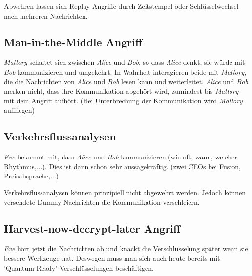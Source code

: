 Abwehren lassen sich Replay Angriffe durch Zeitstempel oder Schlüsselwechsel nach mehreren Nachrichten.

\subsection{Man-in-the-Middle Angriff}
\textit{Mallory} schaltet sich zwischen \textit{Alice} und \textit{Bob}, so dass \textit{Alice} denkt, sie würde mit \textit{Bob} kommunizieren und umgekehrt. In Wahrheit interagieren beide mit \textit{Mallory}, die die Nachrichten von \textit{Alice} und \textit{Bob} lesen kann und weiterleitet. \textit{Alice} und \textit{Bob} merken nicht, dass ihre Kommunikation abgehört wird, zumindest bis \textit{Mallory} mit dem Angriff aufhört. (Bei Unterbrechung der Kommunikation wird \textit{Mallory} auffliegen)

\subsection{Verkehrsflussanalysen}
\textit{Eve} bekommt mit, dass \textit{Alice} und \textit{Bob} kommunizieren (wie oft, wann, welcher Rhythmus,...). Dies ist dann schon sehr aussagekräftig. (zwei CEOs bei Fusion, Preisabsprache,...) 

Verkehrsflussanalysen können prinzipiell nicht abgewehrt werden. Jedoch können versendete Dummy-Nachrichten die Kommunikation verschleiern.

\subsection{Harvest-now-decrypt-later Angriff}
\textit{Eve} hört jetzt die Nachrichten ab und knackt die Verschlüsselung später wenn sie bessere Werkzeuge hat. Deswegen muss man sich auch heute bereits mit 'Quantum-Ready' Verschlüsselungen beschäftigen.

